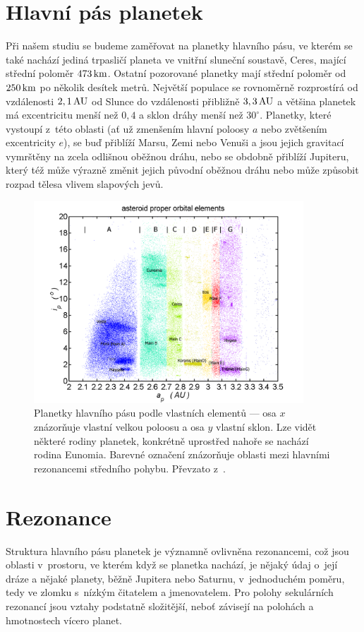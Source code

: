 \documentclass[A4paper, 12pt, oneside]{book}
\begin{document}
\pagebreak
\section{Hlavní pás planetek}
Při našem studiu se budeme zaměřovat na planetky hlavního pásu, ve kterém se také nachází jediná trpasličí planeta ve vnitřní sluneční soustavě, Ceres, mající střední poloměr $473\, {\rm km}$. Ostatní pozorované planetky mají střední poloměr od $250\, {\rm km}$ po několik desítek metrů. Největší populace se rovnoměrně rozprostírá od vzdálenosti $2,1\, {\rm AU}$ od Slunce do vzdálenosti přibližně $3,3\, {\rm AU}$ a většina planetek má excentricitu menší než $0,4$ a sklon dráhy menší než $30^\circ$. Planetky, které vystoupí z~této oblasti (ať už zmenšením hlavní poloosy $a$ nebo zvětšením excentricity $e$), se buď přiblíží Marsu, Zemi nebo Venuši a jsou jejich gravitací vymrštěny na zcela odlišnou oběžnou dráhu, nebo se obdobně přiblíží Jupiteru, který též může výrazně změnit jejich původní oběžnou dráhu nebo může způsobit rozpad tělesa vlivem slapových jevů.

\begin{figure}
	\centering
	\includegraphics[width=0.9\textwidth]{obr/mainbelt.png}
	\caption{Planetky hlavního pásu podle vlastních elementů --- osa $x$ znázorňuje vlastní velkou poloosu a osa $y$ vlastní sklon. Lze vidět některé rodiny planetek, konkrétně uprostřed nahoře se nachází rodina Eunomia. Barevné označení znázorňuje oblasti mezi hlavními rezonancemi středního pohybu. Převzato z~\cite{wiki:belt}.} \label{fig:belt}
\end{figure}

\pagebreak
\section{Rezonance}
Struktura hlavního pásu planetek je významně ovlivněna rezonancemi, což jsou oblasti v~prostoru, ve kterém když se planetka nachází, je nějaký údaj o~její dráze a nějaké planety, běžně Jupitera nebo Saturnu, v~jednoduchém poměru, tedy ve zlomku s~nízkým čitatelem a jmenovatelem. Pro polohy sekulárních rezonancí jsou vztahy podstatně složitější, neboť závisejí na polohách a hmotnostech vícero planet.
\end{document}
